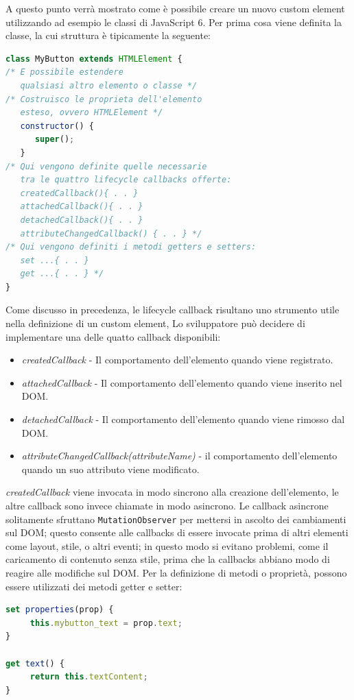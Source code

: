 A questo punto verrà mostrato come è possibile creare un nuovo custom element utilizzando ad esempio le classi di JavaScript 6.
Per prima cosa viene definita la classe, la cui struttura è tipicamente la seguente:
\begin{lstlisting}[language=javascript]
class MyButton extends HTMLElement {    
/* E possibile estendere 
   qualsiasi altro elemento o classe */
/* Costruisco le proprieta dell'elemento 
   esteso, ovvero HTMLElement */     
   constructor() {          
      super();                         
   }   								  
/* Qui vengono definite quelle necessarie 
   tra le quattro lifecycle callbacks offerte:
   createdCallback(){ . . } 
   attachedCallback(){ . . } 
   detachedCallback(){ . . } 
   attributeChangedCallback() { . . } */
/* Qui vengono definiti i metodi getters e setters:
   set ...{ . . } 
   get ...{ . . } */
}
\end{lstlisting}
Come discusso in precedenza, le lifecycle callback risultano uno strumento utile nella definizione di un custom element, Lo sviluppatore può decidere di implementare una delle quatto callback disponibili:
\begin{itemize}
\item \emph {createdCallback} - Il comportamento dell’elemento quando viene registrato.
\item \emph {attachedCallback} - Il comportamento dell’elemento quando viene inserito nel DOM.
\item \emph {detachedCallback} - Il comportamento dell’elemento quando viene rimosso dal DOM.
\item \emph {attributeChangedCallback(attributeName)} - il comportamento dell’elemento quando un suo attributo viene modificato.
\end{itemize}
\emph{createdCallback} viene invocata in modo sincrono alla creazione dell’elemento, le altre callback sono invece chiamate in modo asincrono. Le callback asincrone solitamente sfruttano \texttt{MutationObserver} per mettersi in ascolto dei cambiamenti sul DOM; questo consente alle callbacks di essere invocate prima di altri elementi come layout, stile, o altri eventi; in questo modo si evitano problemi, come il caricamento di contenuto senza stile, prima che la callbacks abbiano modo di reagire alle modifiche sul DOM.
Per la definizione di metodi o proprietà, possono essere utilizzati dei metodi getter e setter:
\begin{lstlisting}[language=javascript]
set properties(prop) {
     this.mybutton_text = prop.text;
}

get text() {
     return this.textContent;
}
\end{lstlisting}
